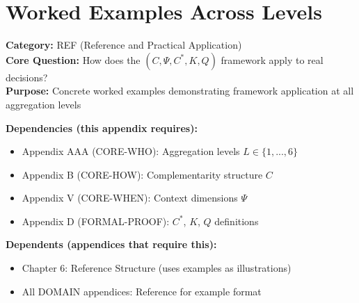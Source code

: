 %
%
%

\section{Worked Examples Across Levels}
\label{app:examples}


\begin{tcolorbox}[colback=gray!5!white, colframe=gray!75!black,
    title=\textbf{Appendix: F REF-EXAMPLES}]

\textbf{Category:} REF (Reference and Practical Application) \\
\textbf{Core Question:} How does the $(C, \Psi, C^*, K, Q)$ framework apply to real decisions? \\
\textbf{Purpose:} Concrete worked examples demonstrating framework application at all aggregation levels

\end{tcolorbox}


\begin{tcolorbox}[colback=yellow!5!white, colframe=yellow!75!black,
    title=\textbf{Cross-Reference Map}]

\textbf{Dependencies (this appendix requires):}
\begin{itemize}[nosep]
    \item Appendix AAA (CORE-WHO): Aggregation levels $L \in \{1,...,6\}$
    \item Appendix B (CORE-HOW): Complementarity structure $C$
    \item Appendix V (CORE-WHEN): Context dimensions $\Psi$
    \item Appendix D (FORMAL-PROOF): $C^*$, $K$, $Q$ definitions
\end{itemize}

\textbf{Dependents (appendices that require this):}
\begin{itemize}[nosep]
    \item Chapter 6: Reference Structure (uses examples as illustrations)
    \item All DOMAIN appendices: Reference for example format
\end{itemize}

\end{tcolorbox}

